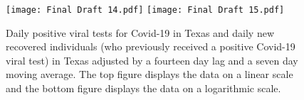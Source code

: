 \documentclass{article}
\begin{document}
\FloatBarrier

\begin{figure}[!htbp]
	\begin{center}
		\texttt{[image: Final Draft 14.pdf]}
		\vspace{1mm}
		\texttt{[image: Final Draft 15.pdf]}
		\caption{Daily positive viral tests for Covid-19 in Texas and daily new recovered individuals (who previously received a positive Covid-19 viral test) in Texas adjusted by a fourteen day lag and a seven day moving average. The top figure displays the data on a linear scale and the bottom figure displays the data on a logarithmic scale. }
		\label{fig:1}
	\end{center}
\end{figure}

\FloatBarrier
\end{document}
